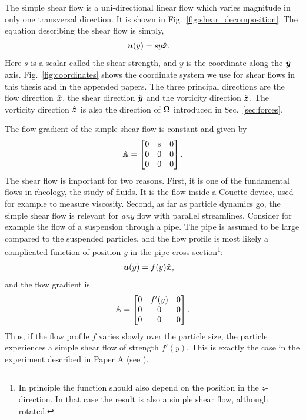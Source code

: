 \documentclass[thesis.tex]{subfiles}
\begin{document}
The simple shear flow is a uni-directional linear flow which varies magnitude in only one transversal direction. It is shown in Fig.~\ref{fig:shear_decomposition}. The equation describing the shear flow is simply,
\begin{align*}
	\mbox{\boldmath$u$}(y) &= s y \hat{\mbox{\boldmath$x$}}.
\end{align*}
Here $s$ is a scalar called the shear strength, and $y$ is the coordinate along the $\hat{\mbox{\boldmath$y$}}$-axis. 
Fig.~\ref{fig:coordinates} shows the coordinate system we use for shear flows in this thesis and in the appended papers. The three principal directions are the flow direction $\hat{\mbox{\boldmath$x$}}$, the shear direction $\hat{\mbox{\boldmath$y$}}$ and the vorticity direction $\hat{\mbox{\boldmath$z$}}$. The vorticity direction $\hat{\mbox{\boldmath$z$}}$ is also the direction of $\mbox{\boldmath$\Omega$}$ introduced in Sec.~\ref{sec:forces}.

The flow gradient of the simple shear flow is constant and given by
\begin{align*}
	\mathbb{A} = \begin{bmatrix}
		0 & s & 0 \\
		0 & 0 & 0 \\
		0 & 0 & 0 
	\end{bmatrix}.
\end{align*}
The shear flow is important for two reasons. First, it is one of the fundamental flows in rheology, the study of fluids. It is the flow inside a Couette device, used for example to measure viscosity. Second, as far as particle dynamics go, the simple shear flow is relevant for \emph{any} flow with parallel streamlines. Consider for example the flow of a suspension through a pipe. The pipe is assumed to be large compared to the suspended particles, and the flow profile is most likely a complicated function of position $y$ in the pipe cross section\footnote{In principle the function should also depend on the position in the $z$-direction. In that case the result is also a simple shear flow, although rotated.}:
\begin{align*}
	\mbox{\boldmath$u$}(y) &= f(y)\hat{\mbox{\boldmath$x$}},
\end{align*}
 and the flow gradient is
\begin{align*}
	\mathbb{A} = \begin{bmatrix}
		0 & f'(y) & 0 \\
		0 & 0 & 0 \\
		0 & 0 & 0 
	\end{bmatrix}.
\end{align*}
Thus, if the flow profile $f$ varies slowly over the particle size, the particle experiences a simple shear flow of strength $f'(y)$. This is exactly the case in the experiment described in Paper A (see ).
\end{document}
